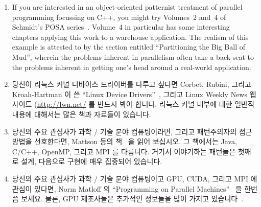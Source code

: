 \begin{enumerate}
\item	If you are interested in an object-oriented patternist
	treatment of parallel programming focussing on C++,
	you might try Volumes~2 and~4 of Schmidt's POSA
	series~\cite{SchmidtStalRohnertBuschmann2000v2Textbook,
	BuschmannHenneySchmidt2007v4Textbook}.
	Volume~4 in particular has some interesting chapters
	applying this work to a warehouse application.
	The realism of this example is attested to by
	the section entitled ``Partitioning the Big Ball of Mud'',
	wherein the problems inherent in parallelism often
	take a back seat to the problems inherent in getting
	one's head around a real-world application.
\fi
\item	당신이 리눅스 커널 디바이스 드라이버를 다루고 싶다면 Corbet, Rubini,
	그리고 Kroah-Hartman 이 쓴
	``Linux Device Drivers''~\cite{CorbetRubiniKroahHartman}, 그리고 Linux
	Weekly News 웹사이트 (\url{http://lwn.net/} 를 반드시 봐야 합니다.
	리눅스 커널 내부에 대한 일반적 내용에 대해서는 많은 책과 자료들이
	있습니다.
\iffalse

\item	If you want to work with Linux-kernel device drivers,
	then Corbet's, Rubini's, and Kroah-Hartman's
	``Linux Device Drivers''~\cite{CorbetRubiniKroahHartman}
	is indispensable, as is the Linux Weekly News web site
	(\url{http://lwn.net/}).
	There is a large number of books and resources on
	the more general topic of Linux kernel internals.
\fi
\item	당신의 주요 관심사가 과학 / 기술 분야 컴퓨팅이라면, 그리고 패턴주의자의
	접근방법을 선호한다면, Mattson 등의 책~\cite{Mattson2005Textbook} 을
	읽어 보십시오.
	그 책에서는 Java, C/C++, OpenMP, 그리고 MPI 를 다룹니다.
	거기서 이야기하는 패턴들은 첫째로 설계, 다음으로 구현에 매우 집중되어
	있습니다.
\iffalse

\item	If your primary focus is scientific and technical computing,
	and you prefer a patternist approach,
	you might try Mattson et al.'s
	textbook~\cite{Mattson2005Textbook}.
	It covers Java, C/C++, OpenMP, and MPI.
	Its patterns are admirably focused first on design,
	then on implementation.
\fi
\item	당신의 주요 관심사가 과학 / 기술 분야 컴퓨팅이고 GPU, CUDA, 그리고 MPI
	에 관심이 있다면, Norm Matloff 의 ``Programming on Parallel
	Machines''~\cite{NormMatloff2013ParProcBook} 을 한번쯤 보세요.
	물론, GPU 제조사들은 추가적인 정보들을 많이 가지고
	있습니다~\cite{AMD2017OpenCL,CyrilZeller2011GPGPUbasics,NVidia2017GPGPU,NVidia2017GPGPU-university}.
\iffalse


\end{enumerate}
